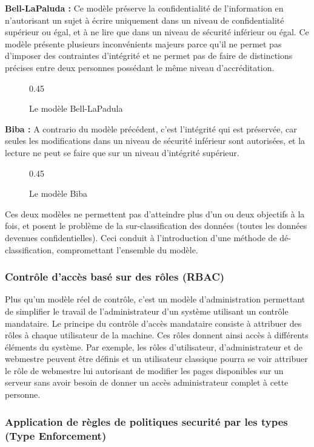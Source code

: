 \textbf{Bell-LaPaluda :} Ce modèle préserve la confidentialité de l'information en n'autorisant un sujet à écrire uniquement dans un niveau de confidentialité supérieur ou égal, et à ne lire que dans un niveau de sécurité inférieur ou égal. Ce modèle présente plusieurs inconvénients majeurs parce qu'il ne permet pas d'imposer des contraintes d'intégrité et ne permet pas de faire de distinctions précises entre deux personnes possédant le même niveau d'accréditation.

\begin{figure}[h]
	\centering
	{0.45}
	\caption{Le modèle Bell-LaPadula}
\end{figure}

\textbf{Biba :} A contrario du modèle précédent, c'est l'intégrité qui est préservée, car seules les modifications dans un niveau de sécurité inférieur sont autorisées, et la lecture ne peut se faire que sur un niveau d'intégrité supérieur.

\begin{figure}[h]
	\centering
	{0.45}
	\caption{Le modèle Biba}
\end{figure}

Ces deux modèles ne permettent pas d'atteindre plus d'un ou deux objectifs à la fois, et posent le problème de la sur-classification des données (toutes les données devenues confidentielles). Ceci conduit à l'introduction d'une méthode de dé-classification, compromettant l'ensemble du modèle.

\subsubsection{Contrôle d'accès basé sur des rôles (RBAC)}

Plus qu'un modèle réel de contrôle, c'est un modèle d'administration permettant de simplifier le travail de l'administrateur d'un système utilisant un contrôle mandataire. Le principe du contrôle d'accès mandataire consiste à attribuer des rôles à chaque utilisateur de la machine. Ces rôles donnent ainsi accès à différents éléments du système. Par exemple, les rôles d'utilisateur, d'administrateur et de webmestre peuvent être définis et un utilisateur classique pourra se voir attribuer le rôle de webmestre lui autorisant de modifier les pages disponibles sur un serveur sans avoir besoin de donner un accès administrateur complet à cette personne.

\subsubsection{Application de règles de politiques securité par les types (Type Enforcement)}

